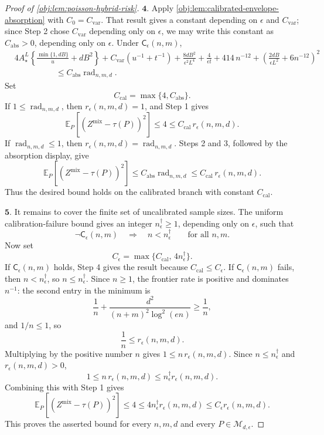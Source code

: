 \begin{proof}[Proof of \cref{obj:lem:poisson-hybrid-risk}]
\(\mathbf{4.}\) Apply \cref{obj:lem:calibrated-envelope-absorption} with \(C_0=C_{\mathrm{var}}\).  That result gives a constant depending on \(\epsilon\) and \(C_{\mathrm{var}}\); since Step 2 chose \(C_{\mathrm{var}}\) depending only on \(\epsilon\), we may write this constant as \(C_{\mathrm{abs}}>0\), depending only on \(\epsilon\).  Under \(\mathsf C_\epsilon(n,m)\),
\[
\begin{aligned}
&4A_\star^L
\left\{
\frac{\min\{1,dB\}}u+dB^2
\right\}
+
C_{\mathrm{var}}\left(u^{-1}+t^{-1}\right)
+
\frac{8dB^2}{\epsilon^2L^4}
+
\frac4{\epsilon t}
+
414\,n^{-12}
+
\left(
\frac{2dB}{\epsilon L^2}+6n^{-12}
\right)^2
\\
&\hspace{5em}\le
C_{\mathrm{abs}}\operatorname{rad}_{n,m,d}.
\end{aligned}
\]
Set
\[
C_{\mathrm{cal}}=\max\{4,C_{\mathrm{abs}}\}.
\]
If \(1\le \operatorname{rad}_{n,m,d}\), then \(r_\epsilon(n,m,d)=1\), and Step 1 gives
\[
\mathbb E_P\!\left[(Z^{\mathrm{mix}}-\tau(P))^2\right]
\le 4
\le C_{\mathrm{cal}}\,r_\epsilon(n,m,d).
\]
If \(\operatorname{rad}_{n,m,d}\le1\), then \(r_\epsilon(n,m,d)=\operatorname{rad}_{n,m,d}\).  Steps 2 and 3, followed by the absorption display, give
\[
\mathbb E_P\!\left[(Z^{\mathrm{mix}}-\tau(P))^2\right]
\le
C_{\mathrm{abs}}\operatorname{rad}_{n,m,d}
\le
C_{\mathrm{cal}}\,r_\epsilon(n,m,d).
\]
Thus the desired bound holds on the calibrated branch with constant \(C_{\mathrm{cal}}\).

\(\mathbf{5.}\) It remains to cover the finite set of uncalibrated sample sizes.  The uniform calibration-failure bound gives an integer \(n_\epsilon^\dagger\ge1\), depending only on \(\epsilon\), such that
\[
\neg\mathsf C_\epsilon(n,m)\quad\Longrightarrow\quad n<n_\epsilon^\dagger
\qquad\text{for all }n,m .
\]
Now set
\[
C_\epsilon=\max\{C_{\mathrm{cal}},\,4n_\epsilon^\dagger\}.
\]
If \(\mathsf C_\epsilon(n,m)\) holds, Step 4 gives the result because \(C_{\mathrm{cal}}\le C_\epsilon\).  If \(\mathsf C_\epsilon(n,m)\) fails, then \(n<n_\epsilon^\dagger\), so \(n\le n_\epsilon^\dagger\).  Since \(n\ge1\), the frontier rate is positive and dominates \(n^{-1}\): the second entry in the minimum is
\[
\frac1n+\frac{d^2}{(n+m)^2\log^2(en)}\ge \frac1n,
\]
and \(1/n\le1\), so
\[
\frac1n\le r_\epsilon(n,m,d).
\]
Multiplying by the positive number \(n\) gives \(1\le n\,r_\epsilon(n,m,d)\).  Since \(n\le n_\epsilon^\dagger\) and \(r_\epsilon(n,m,d)>0\),
\[
1\le n\,r_\epsilon(n,m,d)
\le n_\epsilon^\dagger r_\epsilon(n,m,d).
\]
Combining this with Step 1 gives
\[
\mathbb E_P\!\left[(Z^{\mathrm{mix}}-\tau(P))^2\right]
\le4
\le
4n_\epsilon^\dagger r_\epsilon(n,m,d)
\le
C_\epsilon r_\epsilon(n,m,d).
\]
This proves the asserted bound for every \(n,m,d\) and every \(P\in\mathcal M_{d,\epsilon}\).
\end{proof}
